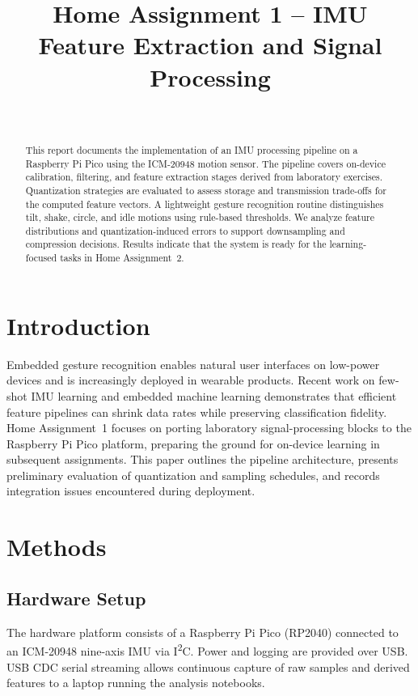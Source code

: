 \documentclass[conference]{IEEEtran}
\title{Home Assignment 1 -- IMU Feature Extraction and Signal Processing}
\author{\IEEEauthorblockN{<Student Name>}\\\IEEEauthorblockA{UNI-ID: <ID>\\IAS0360 -- Embedded Machine Learning on Edge Systems}}
\begin{document}
\maketitle

\begin{abstract}
This report documents the implementation of an IMU processing pipeline on a Raspberry Pi Pico using the ICM-20948 motion sensor. The pipeline covers on-device calibration, filtering, and feature extraction stages derived from laboratory exercises. Quantization strategies are evaluated to assess storage and transmission trade-offs for the computed feature vectors. A lightweight gesture recognition routine distinguishes tilt, shake, circle, and idle motions using rule-based thresholds. We analyze feature distributions and quantization-induced errors to support downsampling and compression decisions. Results indicate that the system is ready for the learning-focused tasks in Home Assignment~2.
\end{abstract}

\section{Introduction}
Embedded gesture recognition enables natural user interfaces on low-power devices and is increasingly deployed in wearable products. Recent work on few-shot IMU learning and embedded machine learning demonstrates that efficient feature pipelines can shrink data rates while preserving classification fidelity. Home Assignment~1 focuses on porting laboratory signal-processing blocks to the Raspberry Pi Pico platform, preparing the ground for on-device learning in subsequent assignments. This paper outlines the pipeline architecture, presents preliminary evaluation of quantization and sampling schedules, and records integration issues encountered during deployment.

\section{Methods}
\subsection{Hardware Setup}
The hardware platform consists of a Raspberry Pi Pico (RP2040) connected to an ICM-20948 nine-axis IMU via I\textsuperscript{2}C. Power and logging are provided over USB. USB CDC serial streaming allows continuous capture of raw samples and derived features to a laptop running the analysis notebooks.
\end{document}
